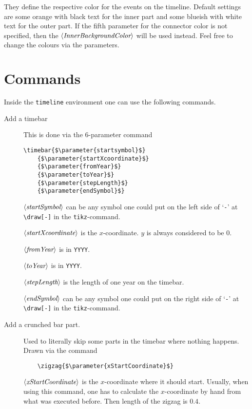 \documentclass{article}
\newcommand{\parameter}[1]{\langle\normalfont\textit{#1}\rangle}
\begin{document}
They define the respective color for the events on the timeline.
Default settings are some orange  with black text for the inner part and some blueish  with white text for the outer part. 
If the fifth parameter for the connector color is not specified, then the $\parameter{InnerBackgroundColor}$ will be used instead.
Feel free to change the colours via the parameters.

\section{Commands}
Inside the \texttt{timeline} environment one can use the following commands.
\begin{description}
	\item[Add a timebar] This is done via the 6-parameter command
\begin{lstlisting}
\timebar{$\parameter{startsymbol}$}
	{$\parameter{startXcoordinate}$}
	{$\parameter{fromYear}$}
	{$\parameter{toYear}$}
	{$\parameter{stepLength}$}
	{$\parameter{endSymbol}$}
\end{lstlisting}
		$\parameter{startSymbol}$ can be any symbol one could put on the left side of `\verb'-'' at \verb'\draw[-]' in the \texttt{tikz}-command.
		
		$\parameter{startXcoordinate}$ is the $x$-coordinate. $y$ is always considered to be $0$.
		
		$\parameter{fromYear}$ is in \texttt{YYYY}.
		
		$\parameter{toYear}$ is in \texttt{YYYY}.
		
		$\parameter{stepLength}$ is the length of one year on the timebar.
		
		$\parameter{endSymbol}$ can be any symbol one could put on the right side of `\verb'-'' at \verb'\draw[-]' in the \texttt{tikz}-command.
	\item[Add a crunched bar part.] Used to literally skip some parts in the timebar where nothing happens. Drawn via the command
\begin{lstlisting}
	\zigzag{$\parameter{xStartCoordinate}$}
\end{lstlisting}
$\parameter{xStartCoordinate}$ is the $x$-coordinate where it should start. Usually, when using this command, one has to calculate the $x$-coordinate by hand from what was executed before.
Then length of the zigzag is $0.4$.


\end{description}
\end{document}
